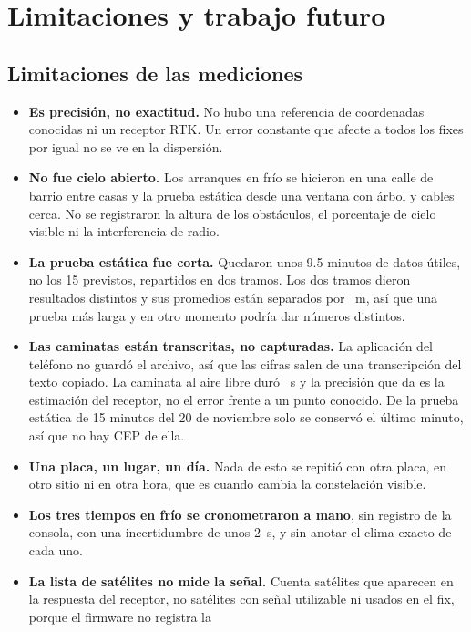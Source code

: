 \section{Limitaciones y trabajo futuro}

\subsection{Limitaciones de las mediciones}

\begin{itemize}
  \item \textbf{Es precisión, no exactitud.} No hubo una referencia de coordenadas conocidas ni un receptor RTK.
        Un error constante que afecte a todos los fixes por igual no se ve en la dispersión.
  \item \textbf{No fue cielo abierto.} Los arranques en frío se hicieron en una calle de barrio entre casas y la
        prueba estática desde una ventana con árbol y cables cerca. No se registraron la altura de los
        obstáculos, el porcentaje de cielo visible ni la interferencia de radio.
  \item \textbf{La prueba estática fue corta.} Quedaron unos 9.5 minutos de datos útiles, no los 15 previstos,
        repartidos en dos tramos. Los dos tramos dieron resultados distintos y sus promedios están separados por
        \dStaticRunSeparation~m, así que una prueba más larga y en otro momento podría dar números distintos.
  \item \textbf{Las caminatas están transcritas, no capturadas.} La aplicación del teléfono no guardó el archivo, así que
        las cifras salen de una transcripción del texto copiado. La caminata al aire libre duró \dWalkSeconds~s y la
        precisión que da es la estimación del receptor, no el error frente a un punto conocido. De la prueba
        estática de 15 minutos del 20 de noviembre solo se conservó el último minuto, así que no hay CEP de ella.
  \item \textbf{Una placa, un lugar, un día.} Nada de esto se repitió con otra placa, en otro sitio ni en otra
        hora, que es cuando cambia la constelación visible.
  \item \textbf{Los tres tiempos en frío se cronometraron a mano}, sin registro de la consola, con una
        incertidumbre de unos 2~s, y sin anotar el clima exacto de cada uno.
  \item \textbf{La lista de satélites no mide la señal.} Cuenta satélites que aparecen en la respuesta del
        receptor, no satélites con señal utilizable ni usados en el fix, porque el firmware no registra la

\end{itemize}
